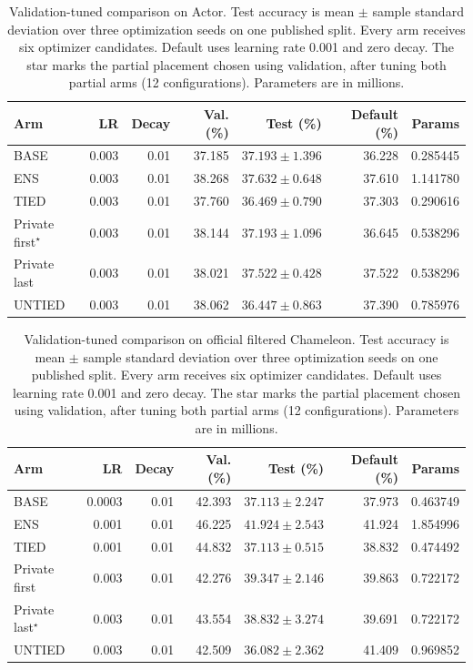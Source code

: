 \begin{table}[t]
\centering
\caption{Validation-tuned comparison on Actor. Test accuracy is mean $\pm$ sample standard deviation over three optimization seeds on one published split. Every arm receives six optimizer candidates. Default uses learning rate 0.001 and zero decay. The star marks the partial placement chosen using validation, after tuning both partial arms (12 configurations). Parameters are in millions.}
\label{tab:tuned-actor}
\small
\setlength{\tabcolsep}{4pt}
\begin{tabular}{lrrrrrr}
\toprule
Arm & LR & Decay & Val. (\%) & Test (\%) & Default (\%) & Params\\
\midrule
BASE & 0.003 & 0.01 & 37.185 & $37.193 \pm 1.396$ & 36.228 & 0.285445\\
ENS & 0.003 & 0.01 & 38.268 & $37.632 \pm 0.648$ & 37.610 & 1.141780\\
TIED & 0.003 & 0.01 & 37.760 & $36.469 \pm 0.790$ & 37.303 & 0.290616\\
Private first$^{\star}$ & 0.003 & 0.01 & 38.144 & $37.193 \pm 1.096$ & 36.645 & 0.538296\\
Private last & 0.003 & 0.01 & 38.021 & $37.522 \pm 0.428$ & 37.522 & 0.538296\\
UNTIED & 0.003 & 0.01 & 38.062 & $36.447 \pm 0.863$ & 37.390 & 0.785976\\
\bottomrule
\end{tabular}
\end{table}

\begin{table}[t]
\centering
\caption{Validation-tuned comparison on official filtered Chameleon. Test accuracy is mean $\pm$ sample standard deviation over three optimization seeds on one published split. Every arm receives six optimizer candidates. Default uses learning rate 0.001 and zero decay. The star marks the partial placement chosen using validation, after tuning both partial arms (12 configurations). Parameters are in millions.}
\label{tab:tuned-chameleon-filtered}
\small
\setlength{\tabcolsep}{4pt}
\begin{tabular}{lrrrrrr}
\toprule
Arm & LR & Decay & Val. (\%) & Test (\%) & Default (\%) & Params\\
\midrule
BASE & 0.0003 & 0.01 & 42.393 & $37.113 \pm 2.247$ & 37.973 & 0.463749\\
ENS & 0.001 & 0.01 & 46.225 & $41.924 \pm 2.543$ & 41.924 & 1.854996\\
TIED & 0.001 & 0.01 & 44.832 & $37.113 \pm 0.515$ & 38.832 & 0.474492\\
Private first & 0.003 & 0.01 & 42.276 & $39.347 \pm 2.146$ & 39.863 & 0.722172\\
Private last$^{\star}$ & 0.003 & 0.01 & 43.554 & $38.832 \pm 3.274$ & 39.691 & 0.722172\\
UNTIED & 0.003 & 0.01 & 42.509 & $36.082 \pm 2.362$ & 41.409 & 0.969852\\
\bottomrule
\end{tabular}
\end{table}

